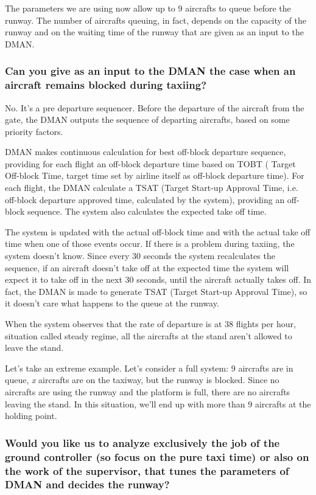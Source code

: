 \documentclass{article}
\begin{document}
The parameters we are using now allow up to 9 aircrafts to queue before the runway. The number of aircrafts queuing, in fact, depends on the capacity of the runway and on the waiting time of the runway that are given as an input to the DMAN.

\subsubsection*{Can you give as an input to the DMAN the case when an aircraft remains blocked during taxiing?}

No. It's a pre departure sequencer. Before the departure of the aircraft from the gate, the DMAN outputs the sequence of departing aircrafts, based on some priority factors.

DMAN makes continuous calculation for best off-block departure sequence, providing for each flight an off-block departure time based on TOBT ( Target Off-block Time, target time set by airline itself as off-block departure time). For each flight, the DMAN calculate a TSAT (Target Start-up Approval Time, i.e. off-block departure approved time, calculated by the system), providing an off-block sequence. The system also calculates the expected take off time.

The system is updated with the actual off-block time and with the actual take off time when one of those events occur.
If there is a problem during taxiing, the system doesn't know. Since every 30 seconds the system recalculates the sequence, if an aircraft doesn't take off at the expected time the system will expect it to take off in the next 30 seconds, until the aircraft actually takes off. In fact, the DMAN is made to generate TSAT (Target Start-up Approval Time), so it doesn't care what happens to the queue at the runway.

When the system observes that the rate of departure is at 38 flights per hour, situation called steady regime, all the aircrafts at the stand aren't allowed to leave the stand. 

Let's take an extreme example. Let's consider a full system: 9 aircrafts are in queue, \textit{x} aircrafts are on the taxiway, but the runway is blocked. Since no aircrafts are using the runway and the platform is full, there are no aircrafts leaving the stand.
In this situation, we'll end up with more than 9 aircrafts at the holding point.



\subsubsection*{Would you like us to analyze exclusively the job of the ground controller (so focus on the pure taxi time) or also on the work of the supervisor, that tunes the parameters of DMAN and decides the runway?}
\end{document}
